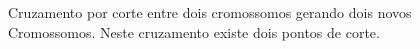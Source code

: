 \documentclass[10pt,a4paper]{article}
\begin{document}
\begin{figure}[H]
  \center
  \caption{Cruzamento por corte entre dois cromossomos gerando dois novos Cromossomos. Neste cruzamento existe dois pontos de corte.}
  \label{fig:MostrandoOCruzamentoPorCorte}
\end{figure} 
\end{document}
